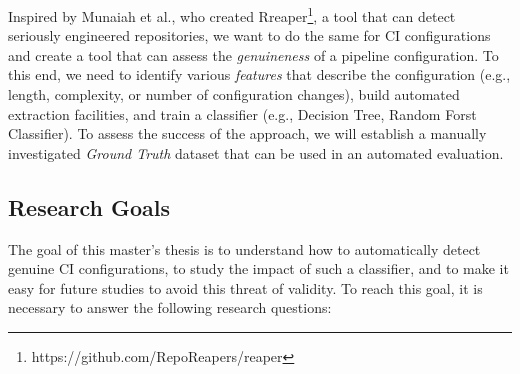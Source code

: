 \documentclass{task_description}
\begin{document}
Inspired by Munaiah et al.\cite{munaiah2017curating}, who created Rreaper\footnote{https://github.com/RepoReapers/reaper}, a tool that can detect seriously engineered repositories, we want to do the same for CI configurations and create a tool that can assess the \emph{genuineness} of a pipeline configuration.
To this end, we need to identify various \emph{features} that describe the configuration (e.g., length, complexity, or number of configuration changes), build automated extraction facilities, and train a classifier (e.g., Decision Tree, Random Forst Classifier).
To assess the success of the approach, we will establish a manually investigated \emph{Ground Truth} dataset that can be used in an automated evaluation.

\subsection*{Research Goals}

The goal of this master's thesis is to understand how to automatically detect genuine CI configurations, to study the impact of such a classifier, and to make it easy for future studies to avoid this threat of validity.
To reach this goal, it is necessary to answer the following research questions:
\end{document}
